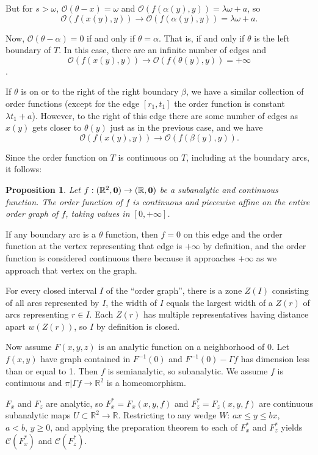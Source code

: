 \documentclass[article]{amsart}
\newtheorem{proposition}[theorem]{Proposition}
\newcommand{\R}{\mathbb R}
\newcommand{\0}{{\bf 0}}
\begin{document}
\noindent But for $s > \omega$, $\mathcal{O}(\theta- x) = \omega$ and $\mathcal{O}(f(\alpha (y), y)) = \lambda\omega + a$, so 
$$
\mathcal{O}(f(x(y),y)) \rightarrow \mathcal{O}(f(\alpha(y), y)) =\lambda \omega +a .
$$

\noindent Now, $\mathcal{O}(\theta-\alpha) = 0$ if and only if $\theta = \alpha$.  That is, if and only if $\theta$ is the left boundary of $T$.  In this case, there are an infinite number of edges and
$$
\mathcal{O}(f(x(y),y)) \rightarrow \mathcal{O}(f(\theta(y), y)) = +\infty
$$.

If $\theta$ is on or to the right of the right boundary $\beta$, we have a similar collection of order functions (except for the edge $[r_1, t_1]$ the order function is constant $\lambda t_1 + a$). However, to the right of this edge there are some number of edges as $x(y)$ gets closer to $\theta(y)$ just as in the previous case, and we have 
$$
\mathcal{O}(f(x(y),y)) \rightarrow \mathcal{O}(f(\beta(y), y))  .
$$

Since the order function on $T$ is continuous on $T$, including at the boundary arcs, it follows:

\begin{proposition} Let $f:( \R^2,\bf{0}) \rightarrow (\R, 0)$ be a subanalytic and continuous function. The order function of $f$ is continuous and piecewise affine on the entire order graph of $f$, taking values in $[0,+\infty]$.
\end{proposition}

If any boundary arc is a $\theta$ function, then $f=0$ on this edge and the  order function at the vertex representing that edge is $+\infty$ by definition, and the order function is considered continuous there because it approaches  $+\infty$ as we approach that vertex on the graph.

 
For every closed interval $I$ of the ``order graph'', there is a zone $Z(I)$ consisting of all arcs represented by $I$, the width of $I$ equals the largest width of a $Z(r)$ of arcs representing $r\in I$.  Each $Z(r)$ has multiple representatives having distance apart $w(Z(r))$, so $I$ by definition is closed.

Now assume $F(x,y,z)$ is an analytic function on a neighborhood of $0$.  Let $f(x,y)$ have graph contained in $F^{-1}(0)$ and $F^{-1}(0) - \Gamma f$ has dimension less than or equal to 1.  Then $f$ is semianalytic, so subanalytic.  We assume $f$ is continuous and $\pi |\Gamma f \rightarrow \R^2$ is a homeomorphism.

$F_x$ and $F_z$ are analytic, so $F_x^* = F_x (x, y, f)$ and $F_z^* = F_z(x, y, f)$ are continuous subanalytic maps $U\subset \R^2 \rightarrow \R$.  Restricting to any wedge $W$: $ax\le y\le bx$, $a<b, \, y\ge 0$, and applying the preparation theorem to each of $F_x^*$ and $F_z^*$ yields 
$\mathcal{C}(F_x^*)$ and $\mathcal{C}(F_z^*)$.  
\end{document}
